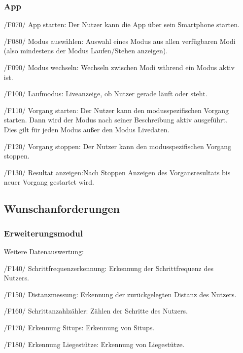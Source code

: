 \documentclass[a4paper,12pt]{article}
\begin{document}
\begin{itemize}
    \subsubsection{App}
      \item[/F070/] \textsf{App starten:} Der Nutzer kann die App über sein Smartphone starten. %
      \item[/F080/] \textsf{Modus auswählen:} Auswahl eines Modus aus allen verfügbaren Modi (also mindestens der Modus \glqq Laufen/Stehen anzeigen\grqq). 
      \item[/F090/] \textsf{Modus wechseln:} Wechseln zwischen Modi während ein Modus aktiv ist. %
      \item[/F100/] \textsf{Laufmodus:} Liveanzeige, ob Nutzer gerade \glqq läuft\grqq{} oder \glqq steht\grqq{}.
      \item[/F110/] \textsf{Vorgang starten:} Der Nutzer kann den modusspezifischen Vorgang starten. Dann wird der Modus nach seiner Beschreibung aktiv ausgeführt. Dies gilt für jeden Modus außer den Modus \glqq Livedaten\grqq.
      \item[/F120/] \textsf{Vorgang stoppen:} Der Nutzer kann den modusspezifischen Vorgang stoppen.
      \item[/F130/] \textsf{Resultat anzeigen:}Nach Stoppen Anzeigen des Vorgansresultats bis neuer Vorgang gestartet wird.
  \subsection{Wunschanforderungen}
    \subsubsection{Erweiterungsmodul}
      Weitere Datenauswertung:
      \item[/F140/] \textsf{Schrittfrequenzerkennung:} Erkennung der Schrittfrequenz des Nutzers. %
      \item[/F150/] \textsf{Distanzmessung:} Erkennung der zurückgelegten Distanz des Nutzers.
      \item[/F160/] \textsf{Schrittanzahlzähler:} Zählen der Schritte des Nutzers.
      \item[/F170/] \textsf{Erkennung Situps:} Erkennung von Situps.
      \item[/F180/] \textsf{Erkennung Liegestütze:} Erkennung von Liegestütze.

\end{itemize}
\end{document}
